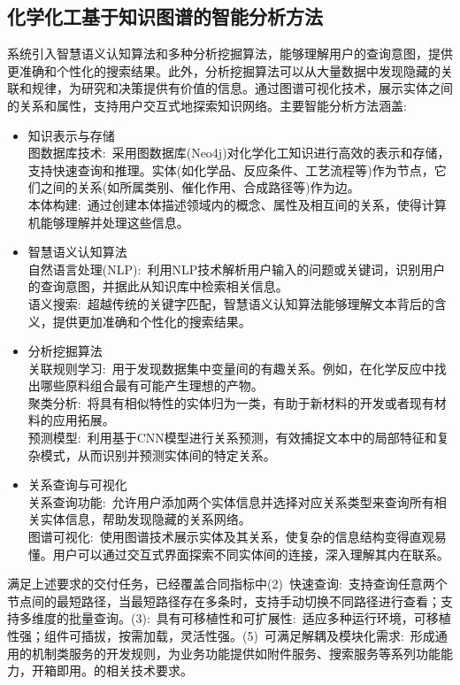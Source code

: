 \subsection{\hwfs 化学化工基于知识图谱的智能分析方法} 
系统引入智慧语义认知算法和多种分析挖掘算法，能够理解用户的查询意图，提供更准确和个性化的搜索结果。此外，分析挖掘算法可以从大量数据中发现隐藏的关联和规律，为研究和决策提供有价值的信息。通过图谱可视化技术，展示实体之间的关系和属性，支持用户交互式地探索知识网络。主要智能分析方法涵盖:
\begin{itemize}
	\item 知识表示与存储\\ 
		图数据库技术:~采用图数据库\textrm{(Neo4j)}对化学化工知识进行高效的表示和存储，支持快速查询和推理。实体(如化学品、反应条件、工艺流程等)作为节点，它们之间的关系(如所属类别、催化作用、合成路径等)作为边。\\ 
本体构建:~通过创建本体描述领域内的概念、属性及相互间的关系，使得计算机能够理解并处理这些信息。

\item 智慧语义认知算法\\
	自然语言处理\textrm{(NLP)}:~利用\textrm{NLP}技术解析用户输入的问题或关键词，识别用户的查询意图，并据此从知识库中检索相关信息。\\ 
语义搜索:~超越传统的关键字匹配，智慧语义认知算法能够理解文本背后的含义，提供更加准确和个性化的搜索结果。 
\item 分析挖掘算法\\ 
关联规则学习:~用于发现数据集中变量间的有趣关系。例如，在化学反应中找出哪些原料组合最有可能产生理想的产物。\\ 
聚类分析:~将具有相似特性的实体归为一类，有助于新材料的开发或者现有材料的应用拓展。\\ 
预测模型:~利用基于\textrm{CNN}模型进行关系预测，有效捕捉文本中的局部特征和复杂模式，从而识别并预测实体间的特定关系。

\item 关系查询与可视化\\ 
关系查询功能:~允许用户添加两个实体信息并选择对应关系类型来查询所有相关实体信息，帮助发现隐藏的关系网络。\\
图谱可视化:~使用图谱技术展示实体及其关系，使复杂的信息结构变得直观易懂。用户可以通过交互式界面探索不同实体间的连接，深入理解其内在联系。
\end{itemize}
满足上述要求的交付任务，已经覆盖合同指标中{\heiti (2)~快速查询:~支持查询任意两个节点间的最短路径，当最短路径存在多条时，支持手动切换不同路径进行查看；支持多维度的批量查询。(3):~具有可移植性和可扩展性:~适应多种运行环境，可移植性强；组件可插拔，按需加载，灵活性强。(5)~可满足解耦及模块化需求:~形成通用的机制类服务的开发规则，为业务功能提供如附件服务、搜索服务等系列功能能力，开箱即用。}的相关技术要求。


